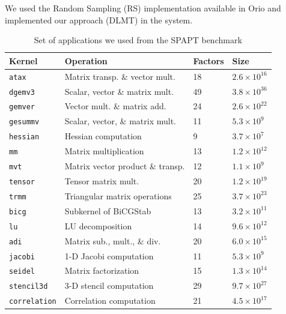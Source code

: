 \documentclass[conference]{IEEEtran}
\begin{document}
We used the Random Sampling (RS) implementation available in Orio and
implemented our approach (DLMT) in the system.

\begin{table}[ht]
\caption{\label{tab:org03fe47f}
Set of applications we used from the SPAPT benchmark}
\centering
\scriptsize
\begin{tabular}{llll}
\toprule
Kernel & Operation & Factors & Size\\
\midrule
\texttt{atax} & Matrix transp. \& vector mult. & 18 & \(2.6 \times 10^{16}\)\\
\texttt{dgemv3} & Scalar, vector \& matrix mult. & 49 & \(3.8 \times 10^{36}\)\\
\texttt{gemver} & Vector mult. \& matrix add. & 24 & \(2.6 \times 10^{22}\)\\
\texttt{gesummv} & Scalar, vector, \& matrix mult. & 11 & \(5.3 \times 10^{9}\)\\
\texttt{hessian} & Hessian computation & 9 & \(3.7 \times 10^{7}\)\\
\texttt{mm} & Matrix multiplication & 13 & \(1.2 \times 10^{12}\)\\
\texttt{mvt} & Matrix vector product \& transp. & 12 & \(1.1 \times 10^{9}\)\\
\texttt{tensor} & Tensor matrix mult. & 20 & \(1.2 \times 10^{19}\)\\
\texttt{trmm} & Triangular matrix operations & 25 & \(3.7 \times 10^{23}\)\\
\texttt{bicg} & Subkernel of BiCGStab & 13 & \(3.2 \times 10^{11}\)\\
\texttt{lu} & LU decomposition & 14 & \(9.6 \times 10^{12}\)\\
\texttt{adi} & Matrix sub., mult., \& div. & 20 & \(6.0 \times 10^{15}\)\\
\texttt{jacobi} & 1-D Jacobi computation & 11 & \(5.3 \times 10^{9}\)\\
\texttt{seidel} & Matrix factorization & 15 & \(1.3 \times 10^{14}\)\\
\texttt{stencil3d} & 3-D stencil computation & 29 & \(9.7 \times 10^{27}\)\\
\texttt{correlation} & Correlation computation & 21 & \(4.5 \times 10^{17}\)\\
\bottomrule
\end{tabular}
\end{table}
\end{document}
